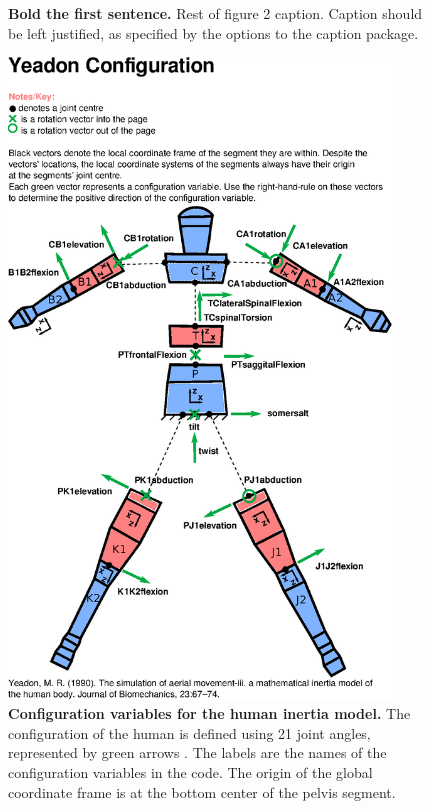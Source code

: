 \documentclass[10pt]{article}
\begin{document}
\begin{figure}[!ht]
\begin{center}
\end{center}
\caption{
{\bf Bold the first sentence.}  Rest of figure 2  caption.  Caption 
should be left justified, as specified by the options to the caption 
package.
}
\label{fig:stadium}
\end{figure}

\begin{figure}[!ht]
\begin{center}
\includegraphics[width=4in]{configuration.eps}
\end{center}
\caption{
{\bf Configuration variables for the human inertia model.}  The configuration of
the human is defined using 21 joint angles, represented by green arrows
\cite{Yeadon1990e}. The labels are the names of the configuration variables in
the code. The origin of the global coordinate frame is at the bottom center of
the pelvis segment.
}
\label{fig:config}
\end{figure}
\end{document}
